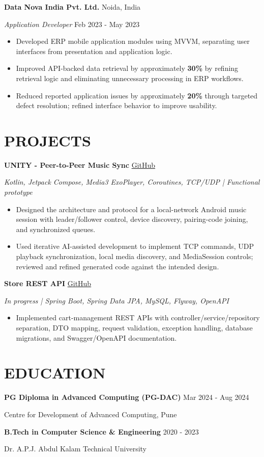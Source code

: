 \documentclass[a4paper,10pt]{article}
\begin{document}
\vspace{3pt}
\textbf{Data Nova India Pvt. Ltd.} \hfill Noida, India\par
\textit{Application Developer} \hfill Feb 2023 - May 2023\par
\begin{itemize}
\item Developed ERP mobile application modules using MVVM, separating user interfaces from presentation and application logic.
\item Improved API-backed data retrieval by approximately \textbf{30\%} by refining retrieval logic and eliminating unnecessary processing in ERP workflows.
\item Reduced reported application issues by approximately \textbf{20\%} through targeted defect resolution; refined interface behavior to improve usability.
\end{itemize}

\section{PROJECTS}
\textbf{UNITY - Peer-to-Peer Music Sync} \hfill \href{https://github.com/yugalteotia/unity-music-sync}{GitHub}\par
\textit{Kotlin, Jetpack Compose, Media3 ExoPlayer, Coroutines, TCP/UDP | Functional prototype}
\begin{itemize}
\item Designed the architecture and protocol for a local-network Android music session with leader/follower control, device discovery, pairing-code joining, and synchronized queues.
\item Used iterative AI-assisted development to implement TCP commands, UDP playback synchronization, local media discovery, and MediaSession controls; reviewed and refined generated code against the intended design.
\end{itemize}
\vspace{2pt}
\textbf{Store REST API} \hfill \href{https://github.com/yugalteotia/spring_api_starter}{GitHub}\par
\textit{In progress | Spring Boot, Spring Data JPA, MySQL, Flyway, OpenAPI}
\begin{itemize}
\item Implemented cart-management REST APIs with controller/service/repository separation, DTO mapping, request validation, exception handling, database migrations, and Swagger/OpenAPI documentation.
\end{itemize}

\section{EDUCATION}
\textbf{PG Diploma in Advanced Computing (PG-DAC)} \hfill Mar 2024 - Aug 2024\par
Centre for Development of Advanced Computing, Pune\par
\vspace{4pt}
\textbf{B.Tech in Computer Science \& Engineering} \hfill 2020 - 2023\par
Dr. A.P.J. Abdul Kalam Technical University
\end{document}
